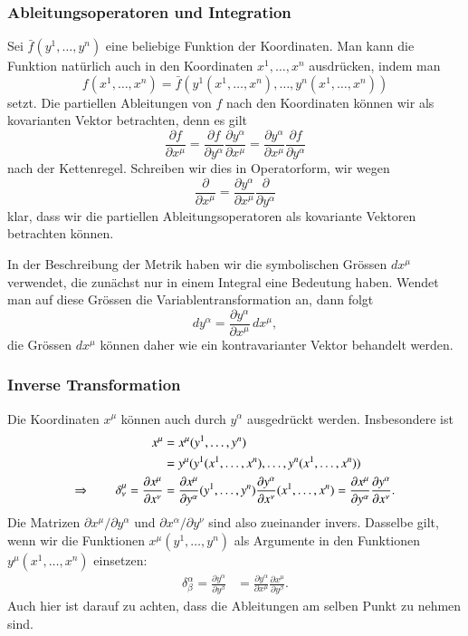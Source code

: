 \subsubsection{Ableitungsoperatoren und Integration}
Sei $\bar f(y^1,\dots,y^n)$ eine beliebige Funktion der Koordinaten.
Man kann die Funktion natürlich auch in den Koordinaten $x^1,\dots,x^n$
ausdrücken, indem man 
\[
f(x^1,\dots,x^n) = \bar f(y^1(x^1,\dots,x^n),\dots, y^n(x^1,\dots,x^n))
\]
setzt.
Die partiellen Ableitungen von $f$ nach den Koordinaten können wir
als kovarianten Vektor betrachten, denn es gilt
\[
\frac{\partial f}{\partial x^\mu}
=
\frac{\partial f}{\partial y^\alpha}\frac{\partial y^\alpha}{\partial x^\mu}
=
\frac{\partial y^\alpha}{\partial x^\mu}
\frac{\partial f}{\partial y^\alpha}
\]
nach der Kettenregel.
Schreiben wir dies in Operatorform, wir wegen
\[
\frac{\partial}{\partial x^\mu}
=
\frac{\partial y^\alpha}{\partial x^\mu}
\frac{\partial}{\partial y^\alpha}
\]
klar, dass wir die partiellen Ableitungsoperatoren als kovariante Vektoren
betrachten können.

In der Beschreibung der Metrik haben wir die symbolischen Grössen $dx^\mu$
verwendet, die zunächst nur in einem Integral eine Bedeutung haben.
Wendet man auf diese Grössen die Variablentransformation an, dann
folgt
\[
dy^\alpha
=
\frac{\partial y^\alpha}{\partial x^\mu}\,dx^\mu,
\]
die Grössen $dx^\mu$ können daher wie ein kontravarianter Vektor behandelt
werden.

\subsubsection{Inverse Transformation}
Die Koordinaten $x^\mu$ können auch durch $y^\alpha$ ausgedrückt werden.
Insbesondere ist
\begin{align}
x^\mu
&=
x^\mu(y^1,\dots,y^n)
\notag
\\
&=
y^\mu(y^1(x^1,\dots,x^n),\dots,y^n(x^1,\dots,x^n))
\notag
\\
\Rightarrow\qquad
\delta^\mu_\nu
=
\frac{\partial x^\mu}{\partial x^\nu}
&=
\frac{\partial x^\mu}{\partial y^\alpha}(y^1,\dots,y^n)
\frac{\partial y^\alpha}{\partial x^\nu}(x^1,\dots,x^n)
=
\frac{\partial x^\mu}{\partial y^\alpha}
\frac{\partial y^\alpha}{\partial x^\nu}.
\label{label:trafo:t}
\end{align}
Die Matrizen $\partial x^\mu/\partial y^\alpha$ und
$\partial x^\alpha/\partial y^\nu$ sind also zueinander invers.
Dasselbe gilt, wenn wir die Funktionen $x^\mu(y^1,\dots,y^n)$
als Argumente in den Funktionen $y^\mu(x^1,\dots,x^n)$ einsetzen:
\begin{align}
\delta^\alpha_\beta
=
\frac{\partial y^\alpha}{\partial y^\beta}
&=
\frac{\partial y^\alpha}{\partial x^\mu}
\frac{\partial x^\mu}{\partial y^\beta}.
\label{label:trafo:tinv}
\end{align}
Auch hier ist darauf zu achten, dass die Ableitungen am selben
Punkt zu nehmen sind.

